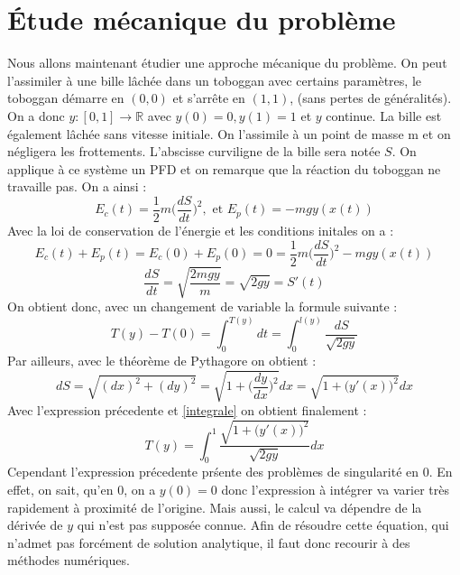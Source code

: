 \documentclass[a4paper,10pt]{article}
\begin{document}
\section{\'Etude m\'ecanique du probl\`eme}
Nous allons maintenant \'etudier une approche m\'ecanique du probl\`eme. On peut l'assimiler \`a une bille l\^ach\'ee dans un toboggan avec certains param\`etres, le toboggan d\'emarre en $(0,0)$
et s'arrête en $(1,1)$, (sans pertes de g\'en\'eralit\'es). On a donc $y : [0,1]\longrightarrow \mathbb{R}$ avec $y(0) = 0, y(1) = 1$ et $y$ continue. La bille est \'egalement l\^ach\'ee sans vitesse initiale.
On l'assimile \`a un point de masse m et on n\'egligera les frottements. L'abscisse curviligne de la bille sera not\'ee $S$.
\newline
On applique \`a ce syst\`eme un PFD et on remarque que la r\'eaction du toboggan ne travaille pas. On a ainsi :
\begin{equation}
 E_c(t) = \frac{1}{2}m\Big(\frac{dS}{dt}\Big)^2, \text{ et } E_p(t) = -mgy(x(t))
\end{equation}
Avec la loi de conservation de l'\'energie et les conditions initales on a :
\begin{equation}
 E_c(t) + E_p(t) = E_c(0) + E_p(0) = 0 = \frac{1}{2}m\Big(\frac{dS}{dt}\Big)^2 - mgy(x(t)) 
\end{equation}
\begin{equation}
 \frac{dS}{dt}=\sqrt{\frac{2mgy}{m}} = \sqrt{2gy} = S'(t)
\end{equation}
On obtient donc, avec un changement de variable la formule suivante :
\begin{equation}
\label{integrale}
 T(y) - T(0) = \int_0^{T(y)} dt = \int_0^{l(y)} \frac{dS}{\sqrt{2gy}}
\end{equation}
Par ailleurs, avec le th\'eor\`eme de Pythagore on obtient :
\begin{equation}
 dS = \sqrt{(dx)^2 + (dy)^2} = \sqrt{1 + \Big(\frac{dy}{dx}\Big)^2}dx = \sqrt{1 + \Big(y'(x)\Big)^2}dx
\end{equation}
Avec l'expression pr\'ecedente et \ref{integrale} on obtient finalement :
\begin{equation}
 T(y) = \int_0^1 \frac{\sqrt{1 + \Big(y'(x)\Big)^2}}{\sqrt{2gy}}dx
\end{equation}
Cependant l'expression pr\'ecedente pr\'sente des probl\`emes de singularit\'e en 0. En effet, on sait, qu'en 0, on a $y(0) = 0$ donc l'expression \`a int\'egrer  va varier tr\`es rapidement
\`a proximit\'e de l'origine. Mais aussi, le calcul va d\'ependre de la d\'eriv\'ee de $y$ qui n'est pas suppos\'ee connue. Afin de r\'esoudre cette \'equation, qui n'admet pas forc\'ement de solution
analytique, il faut donc recourir \`a des m\'ethodes num\'eriques. 
\end{document}
